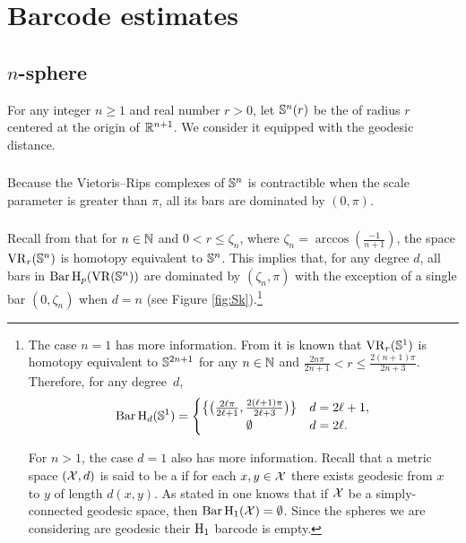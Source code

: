 
\section{Barcode estimates}\label{s:computations}

\subsection{$n$-sphere}\label{ss:Sn}

For any integer $n \geq 1$ and real number $r > 0$, let $\mathbb{S}^n(r)$ be the  of radius $r$ centered at the origin of $\mathbb{R}^{n+1}$.
We consider it equipped with the geodesic distance.

\subsubsection{}

Because the Vietoris--Rips complexes of $\mathbb{S}^n$ is contractible when the scale parameter is greater than $\pi$, all its bars are dominated by $(0, \pi)$.

\subsubsection{} 

Recall from \cite[Thm.~10]{lim2020vietoris} that for $n \in \mathbb{N}$ and  $0 < r \leq \zeta_n$, where $\zeta_n = \arccos(\tfrac{-1}{n+1})$, the space $\operatorname{VR}_r(\mathbb{S}^n)$ is homotopy equivalent to $\mathbb{S}^n$.
This implies that, for any degree $d$, all bars in $\operatorname{Bar}\mathrm{H}_p (\operatorname{VR}(\mathbb{S}^n))$ are dominated by $(\zeta_n,\pi)$ with the exception of a single bar $(0,\zeta_n)$ when $d = n$ (see Figure \ref{fig:Sk}).\footnote{The case $n = 1$ has more information.
	From \cite[Thm.~7.4]{adamaszek2017vietoris} it is known that $\operatorname{VR}_r(\mathbb{S}^1)$ is homotopy equivalent to $\mathbb{S}^{2n+1}$ for any $n \in \mathbb{N}$ and $\frac{2n\pi}{2n+1} < r \leq \frac{2(n+1)\pi}{2n+3}$.
	Therefore, for any degree~$d$,
	\[
	\barc \rH_{d}(\bS^1) =
	\begin{cases}
		\set[\big]{\big(\tfrac{2\ell\pi}{2\ell+1}, \tfrac{2(\ell+1)\pi}{2\ell+3}\big)} & d = 2\ell+1, \\
		\hfil\emptyset & d = 2\ell.
	\end{cases}
	\]
	
	For $n > 1$, the case $d=1$ also has more information.
	Recall that a metric space $(\mathcal{X}, d)$ is said to be a  if for each $x, y \in \mathcal{X}$ there exists geodesic from $x$ to $y$ of length $d(x, y)$.
	As stated in \cite[Prop.~7.10]{virk20201} one knows that if $\mathcal{X}$ be a simply-connected geodesic space, then $\operatorname{Bar}\mathrm{H}_1(\mathcal{X}) = \emptyset$.
	Since the spheres we are considering are geodesic their $\mathrm{H}_1$ barcode is empty. }

